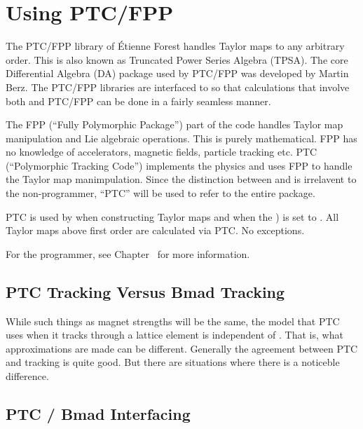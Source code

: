 \chapter{Using PTC/FPP}
\label{c:ptc.use}


The PTC/FPP library of \'Etienne Forest handles Taylor maps to any arbitrary order. This is also
known as Truncated Power Series Algebra (TPSA). The core Differential Algebra (DA) package used by
PTC/FPP was developed by Martin Berz\cite{b:berz}. The PTC/FPP libraries are interfaced to \bmad so
that calculations that involve both \bmad and PTC/FPP can be done in a fairly seamless manner.

The FPP (``Fully Polymorphic Package'') part of the code handles Taylor map manipulation
and Lie algebraic operations. This is purely mathematical. FPP has no knowledge of accelerators,
magnetic fields, particle tracking etc. PTC (``Polymorphic Tracking Code'') implements the physics
and uses FPP to handle the Taylor map manimpulation. Since the distinction between  and
 is irrelavent to the non-programmer, ``PTC'' will be used to refer to the entire package.

PTC is used by \bmad when constructing Taylor maps and when the 
) is set to . All Taylor maps above first order are calculated
via PTC. No exceptions.

For the programmer, see Chapter~ for more information.

\section{PTC Tracking Versus Bmad Tracking}
\label{s:ptc.bmad.track}

While such things as magnet strengths will be the same, the model that PTC uses when it tracks
through a lattice element is independent of \bmad. That is, what approximations are made can be
different. Generally the agreement between PTC and \bmad tracking is quite good. But there are
situations where there is a noticeble difference.


\section{PTC / Bmad Interfacing}
\label{s:ptc.bmad.track}

